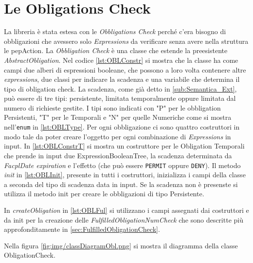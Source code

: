 \section{Le Obligations Check}
\label{sec:Le Obligations Check}
La libreria è stata estesa con le \emph{Obbligations Check} perché c'era bisogno di obbligazioni che avessero solo
\emph{Expressions} da verificare senza avere nella struttura le pepAction.
La \emph{Obbligation Check} è una classe che estende la preesistente \emph{AbstractObligation}.
Nel codice \ref{lst:OBLConstr} si mostra che la classe ha come campi due alberi di espressioni booleane, che possono
a loro volta contenere altre \emph{expressions}, due classi per indicare la scadenza e una variabile che determina
il tipo di obligation check.
La scadenza, come già detto in \ref{sub:Semantica_Ext}, può essere di tre tipi: persistente,
limitata temporalmente oppure limitata dal numero di richieste gestite. I tipi sono indicati con "P" per le obbligation Persistenti,
"T" per le Temporali e "N" per quelle Numeriche come si mostra nell'\texttt{enum} in \ref{lst:OBLType}.
Per ogni obbligazione ci sono quattro costruttori in modo tale da poter creare l'oggetto per ogni combinazione di \emph{Expressions}
in input. In \ref{lst:OBLConstrT} si mostra un costruttore per le Obligation Temporali che prende in input due ExpressionBooleanTree,
la scadenza determinata da \emph{FacplDate expiration} e l'effetto (che può essere \texttt{PERMIT} oppure \texttt{DENY}).
Il metodo \emph{init} in \ref{lst:OBLInit}, presente in tutti i costruttori, inizializza i campi della classe a seconda del tipo di scadenza data
in input. Se la scadenza non è presenste si utilizza il metodo init per creare le obbligazioni di tipo Persistente.

In \emph{createObligation} in \ref{lst:OBLFul} si utilizzano i campi assegnati dai costruttori
e da init per la creazione delle \emph{FulfilledObligationNumCheck}
che sono descritte più approfonditamente in \ref{sec:FulfilledObligationCheck}.

Nella figura \ref{fig:img/classDiagramObl.png} si mostra il diagramma della classe ObligationCheck.
